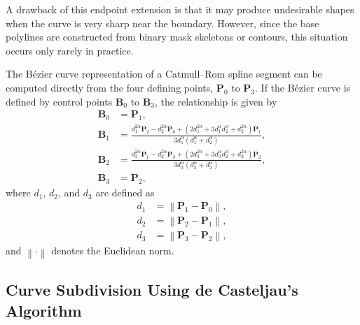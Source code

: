 
A drawback of this endpoint extension is that it may produce undesirable shapes when the curve is very sharp near the boundary. However, since the base polylines are constructed from binary mask skeletons or contours, this situation occurs only rarely in practice.


The B\'ezier curve representation of a Catmull--Rom spline segment can be computed directly from the four defining points, $\mathbf{P}_0$ to $\mathbf{P}_3$. If the B\'ezier curve is defined by control points $\mathbf{B}_0$ to $\mathbf{B}_3$, the relationship is given by~\cite{bk_catmull_rom_bezier}
\begin{align}
	\mathbf{B}_0 &= \mathbf{P}_1, \\
	\mathbf{B}_1 &= \frac{d_1^{2\alpha}\mathbf{P}_2 - d_2^{2\alpha}\mathbf{P}_0 + \left(2d_1^{2\alpha} + 3d_1^\alpha d_2^\alpha + d_2^{2\alpha}\right)\mathbf{P}_1}{3d_1^\alpha\left(d_1^\alpha + d_2^\alpha\right)}, \\
	\mathbf{B}_2 &= \frac{d_3^{2\alpha}\mathbf{P}_1 - d_2^{2\alpha}\mathbf{P}_3 + \left(2d_3^{2\alpha} + 3d_3^\alpha d_2^\alpha + d_2^{2\alpha}\right)\mathbf{P}_2}{3d_3^\alpha\left(d_3^\alpha + d_2^\alpha\right)}, \\
	\mathbf{B}_3 &= \mathbf{P}_2,
\end{align}
where $d_1$, $d_2$, and $d_3$ are defined as
\begin{align}
	d_1 &= \left\lVert \mathbf{P}_1 - \mathbf{P}_0 \right\rVert, \\
	d_2 &= \left\lVert \mathbf{P}_2 - \mathbf{P}_1 \right\rVert, \\
	d_3 &= \left\lVert \mathbf{P}_3 - \mathbf{P}_2 \right\rVert,
\end{align}
and $\left\lVert \cdot \right\rVert$ denotes the Euclidean norm.

\subsection{Curve Subdivision Using de Casteljau's Algorithm}
